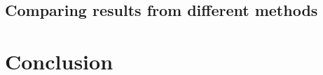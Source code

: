 \documentclass[twoside]{article}
\theoremstyle{theorem}
\theoremstyle{theorem}
\theoremstyle{theorem}
\theoremstyle{lemma}
\theoremstyle{definition}
\theoremstyle{example}
\begin{document}
%
%
\subsection{Comparing results from different methods}

\section{Conclusion}





\end{document}
